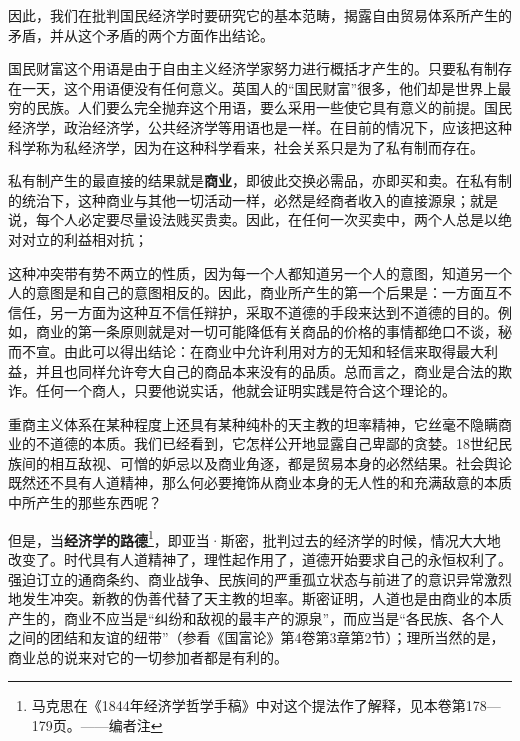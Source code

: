 \documentclass[a4paper,twoside,12pt]{ctexart}
\begin{document}
因此，我们在批判国民经济学时要研究它的基本范畴，揭露自由贸易体系所产生的矛盾，并从这个矛盾的两个方面作出结论。 

国民财富这个用语是由于自由主义经济学家努力进行概括才产生的。只要私有制存在一天，这个用语便没有任何意义。英国人的“国民财富”很多，他们却是世界上最穷的民族。人们要么完全抛弃这个用语，要么采用一些使它具有意义的前提。国民经济学，政治经济学，公共经济学等用语也是一样。在目前的情况下，应该把这种科学称为私经济学，因为在这种科学看来，社会关系只是为了私有制而存在。 

私有制产生的最直接的结果就是\textbf{商业}，即彼此交换必需品，亦即买和卖。在私有制的统治下，这种商业与其他一切活动一样，必然是经商者收入的直接源泉；就是说，每个人必定要尽量设法贱买贵卖。因此，在任何一次买卖中，两个人总是以绝对对立的利益相对抗；

这种冲突带有势不两立的性质，因为每一个人都知道另一个人的意图，知道另一个人的意图是和自己的意图相反的。因此，商业所产生的第一个后果是：一方面互不信任，另一方面为这种互不信任辩护，采取不道德的手段来达到不道德的目的。例如，商业的第一条原则就是对一切可能降低有关商品的价格的事情都绝口不谈，秘而不宣。由此可以得出结论：在商业中允许利用对方的无知和轻信来取得最大利益，并且也同样允许夸大自己的商品本来没有的品质。总而言之，商业是合法的欺诈。任何一个商人，只要他说实话，他就会证明实践是符合这个理论的。

重商主义体系在某种程度上还具有某种纯朴的天主教的坦率精神，它丝毫不隐瞒商业的不道德的本质。我们已经看到，它怎样公开地显露自己卑鄙的贪婪。18世纪民族间的相互敌视、可憎的妒忌以及商业角逐，都是贸易本身的必然结果。社会舆论既然还不具有人道精神，那么何必要掩饰从商业本身的无人性的和充满敌意的本质中所产生的那些东西呢？

但是，当\textbf{经济学的路德}\footnote{马克思在《1844年经济学哲学手稿》中对这个提法作了解释，见本卷第178—179页。——编者注}，即亚当·斯密，批判过去的经济学的时候，情况大大地改变了。时代具有人道精神了，理性起作用了，道德开始要求自己的永恒权利了。强迫订立的通商条约、商业战争、民族间的严重孤立状态与前进了的意识异常激烈地发生冲突。新教的伪善代替了天主教的坦率。斯密证明，人道也是由商业的本质产生的，商业不应当是“纠纷和敌视的最丰产的源泉”，而应当是“各民族、各个人之间的团结和友谊的纽带”（参看《国富论》第4卷第3章第2节）；理所当然的是，商业总的说来对它的一切参加者都是有利的。
\end{document}
